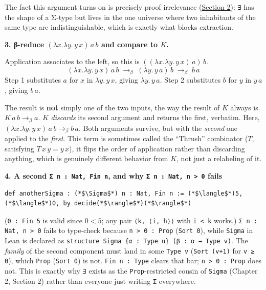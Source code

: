 The fact this argument turns on is precisely proof irrelevance (\hyperref[sec:02-terminology-and-coc:02-pi-sigma-and-coc:1]{Section 2}): \texttt{∃} has the shape of a Σ-type but lives in the one universe where two inhabitants of the same type are indistinguishable, which is exactly what blocks extraction.

\textbf{3. β-reduce \((\lambda x.\lambda y.\, y\, x)\, a\, b\) and compare to \(K\).}

Application associates to the left, so this is \(((\lambda x.\lambda y.\, y\, x)\, a)\, b\). \[
(\lambda x.\lambda y.\, y\, x)\, a\, b
\;\longrightarrow_\beta\; (\lambda y.\, y\, a)\, b
\;\longrightarrow_\beta\; b\, a
\] Step 1 substitutes \(a\) for \(x\) in \(\lambda y.\, y\, x\), giving \(\lambda y.\, y\, a\). Step 2 substitutes \(b\) for \(y\) in \(y\, a\), giving \(b\, a\).

The result is \textbf{not} simply one of the two inputs, the way the result of \(K\) always is. \(K\,a\,b \to_\beta a\). \(K\) \emph{discards} its second argument and returns the first, verbatim. Here, \((\lambda x.\lambda y.\, y\, x)\, a\, b
\to_\beta b\, a\). Both arguments survive, but with the \emph{second} one applied to the \emph{first}. This term is sometimes called the ``Thrush'' combinator (\(T\), satisfying \(T\, x\, y = y\, x\)), it flips the order of application rather than discarding anything, which is genuinely different behavior from \(K\), not just a relabeling of it.

\textbf{4. A second \texttt{Σ n : Nat, Fin n}, and why \texttt{Σ n : Nat, n > 0} fails}

\begin{lstlisting}
def anotherSigma : (*$\Sigma$*) n : Nat, Fin n := (*$\langle$*)5, (*$\langle$*)0, by decide(*$\rangle$*)(*$\rangle$*)
\end{lstlisting}

(\texttt{0 : Fin 5} is valid since \(0 < 5\); any pair \texttt{⟨k, ⟨i, h⟩⟩} with \texttt{i < k} works.) \texttt{Σ n : Nat, n > 0} fails to type-check because \texttt{n > 0 : Prop} (\texttt{Sort 0}), while \texttt{Sigma} in Lean is declared as \texttt{structure Sigma \{α : Type u\} (β : α → Type v)}. The \emph{family} of the second component must land in some \texttt{Type v} (\texttt{Sort (v+1)} for \texttt{v ≥ 0}), which \texttt{Prop} (\texttt{Sort 0}) is not. \texttt{Fin n : Type} clears that bar; \texttt{n > 0 : Prop} does not. This is exactly why \texttt{∃} exists as the \texttt{Prop}-restricted cousin of \texttt{Sigma} (Chapter 2, Section 2) rather than everyone just writing \texttt{Σ} everywhere.

